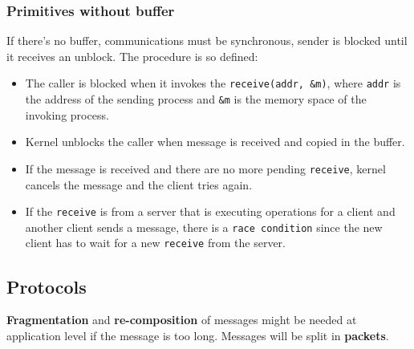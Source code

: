 \documentclass[11pt,a4paper]{article}
\begin{document}
\subsubsection{Primitives without buffer}
If there's no buffer, communications must be synchronous, sender is blocked until it receives an unblock. The procedure is so defined:
\begin{itemize}
	\item The caller is blocked when it invokes the \verb!receive(addr, &m)!, where \verb!addr! is the address of the sending process and \verb!&m! is the memory space of the invoking process.
	\item Kernel unblocks the caller when message is received and copied in the buffer.
	\item If the message is received and there are no more pending \verb!receive!, kernel cancels the message and the client tries again.
	\item If the \verb!receive! is from a server that is executing operations for a client and another client sends a message, there is a \verb!race condition! since the new client has to wait for a new \verb!receive! from the server.
\end{itemize}
   
\subsection{Protocols}
\textbf{Fragmentation} and \textbf{re-composition} of messages might be needed at application level if the message is too long. Messages will be split in \textbf{packets}.
\end{document}

